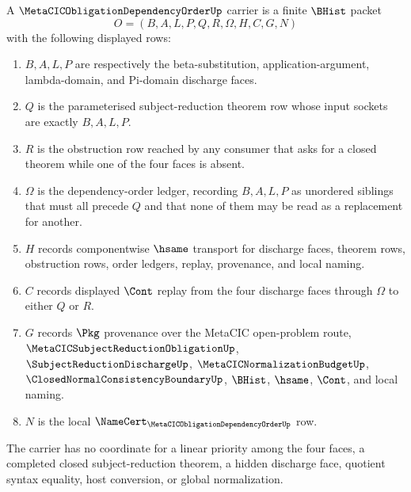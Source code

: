 \begin{definition}
\label{def:metacic-obligation-dependency-order-carrier}
A $\MetaCICObligationDependencyOrderUp$ carrier is a finite $\BHist$ packet
$$
O=(B,A,L,P,Q,R,\Omega,H,C,G,N)
$$
with the following displayed rows:
\begin{enumerate}
\item $B,A,L,P$ are respectively the beta-substitution, application-argument, lambda-domain, and Pi-domain discharge faces.
\item $Q$ is the parameterised subject-reduction theorem row whose input sockets are exactly $B,A,L,P$.
\item $R$ is the obstruction row reached by any consumer that asks for a closed theorem while one of the four faces is absent.
\item $\Omega$ is the dependency-order ledger, recording $B,A,L,P$ as unordered siblings that must all precede $Q$ and that none of them may be read as a replacement for another.
\item $H$ records componentwise $\hsame$ transport for discharge faces, theorem rows, obstruction rows, order ledgers, replay, provenance, and local naming.
\item $C$ records displayed $\Cont$ replay from the four discharge faces through $\Omega$ to either $Q$ or $R$.
\item $G$ records $\Pkg$ provenance over the MetaCIC open-problem route, $\MetaCICSubjectReductionObligationUp$, $\SubjectReductionDischargeUp$, $\MetaCICNormalizationBudgetUp$, $\ClosedNormalConsistencyBoundaryUp$, $\BHist$, $\hsame$, $\Cont$, and local naming.
\item $N$ is the local $\NameCert_{\MetaCICObligationDependencyOrderUp}$ row.
\end{enumerate}
The carrier has no coordinate for a linear priority among the four faces, a completed closed subject-reduction theorem, a hidden discharge face, quotient syntax equality, host conversion, or global normalization.
\end{definition}

